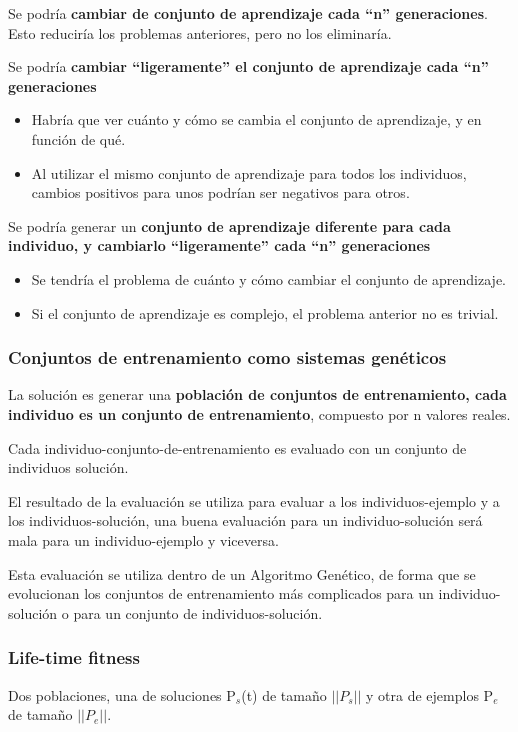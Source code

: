 \documentclass[12pt, twoside, openright]{report} %
\begin{document}
Se podría \textbf{cambiar de conjunto de aprendizaje cada “n” generaciones}. Esto reduciría los problemas anteriores, pero no los eliminaría.

Se podría \textbf{cambiar “ligeramente” el conjunto de aprendizaje cada “n” generaciones}
\begin{itemize}
	\item Habría que ver cuánto y cómo se cambia el conjunto de aprendizaje, y en función de qué.
	\item Al utilizar el mismo conjunto de aprendizaje para todos los individuos, cambios positivos para unos podrían ser negativos para otros.
\end{itemize}

Se podría generar un \textbf{conjunto de aprendizaje diferente para cada individuo, y cambiarlo “ligeramente” cada “n” generaciones}
\begin{itemize}
	\item Se tendría el problema de cuánto y cómo cambiar el conjunto de aprendizaje.
	\item Si el conjunto de aprendizaje es complejo, el problema anterior no es trivial.
\end{itemize}

\subsubsection{Conjuntos de entrenamiento como sistemas genéticos}
La solución es generar una \textbf{población de conjuntos de entrenamiento, cada individuo es un conjunto de entrenamiento}, compuesto por n valores reales.

Cada individuo-conjunto-de-entrenamiento es evaluado con un conjunto de individuos solución.

El resultado de la evaluación se utiliza para evaluar a los individuos-ejemplo y a los individuos-solución, una buena evaluación para un individuo-solución será mala para un individuo-ejemplo y viceversa.

Esta evaluación se utiliza dentro de un Algoritmo Genético, de forma que se evolucionan los conjuntos de entrenamiento más complicados para un individuo-solución o para un conjunto de individuos-solución.

\subsubsection{Life-time fitness}
Dos poblaciones, una de soluciones P$_s$(t) de tamaño $|| P_s ||$ y otra de ejemplos P$_e$ de tamaño $|| P_e ||$.
\end{document}
